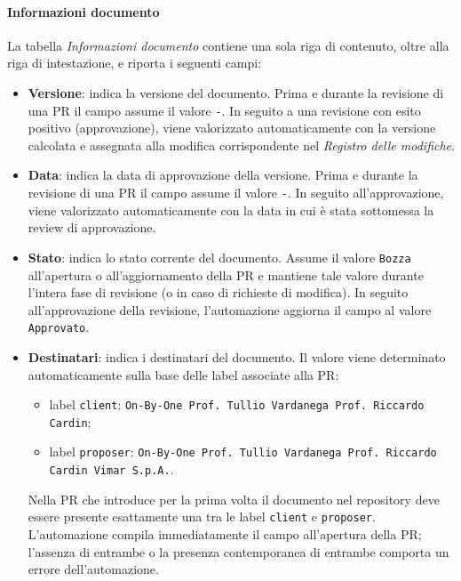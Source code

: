 \documentclass[11pt, a4paper]{article}
\begin{document}
\paragraph{Informazioni documento}

La tabella \textit{Informazioni documento} contiene una sola riga di contenuto, oltre alla riga di intestazione, e riporta i seguenti campi:

\begin{itemize}
    \item \textbf{Versione}: indica la versione del documento. Prima e durante la revisione di una PR il campo assume il valore \texttt{-}. In seguito a una revisione con esito positivo (approvazione), viene valorizzato automaticamente con la versione calcolata e assegnata alla modifica corrispondente nel \textit{Registro delle modifiche}.

    \item \textbf{Data}: indica la data di approvazione della versione. Prima e durante la revisione di una PR il campo assume il valore \texttt{-}. In seguito all'approvazione, viene valorizzato automaticamente con la data in cui è stata sottomessa la review di approvazione.

    \item \textbf{Stato}: indica lo stato corrente del documento. Assume il valore \texttt{Bozza} all'apertura o all'aggiornamento della PR e mantiene tale valore durante l'intera fase di revisione (o in caso di richieste di modifica). In seguito all'approvazione della revisione, l'automazione aggiorna il campo al valore \texttt{Approvato}.

    \item \textbf{Destinatari}: indica i destinatari del documento. Il valore viene determinato automaticamente sulla base delle label associate alla PR:
    \begin{itemize}
        \item label \texttt{client}:
        \texttt{On-By-One \newline Prof. Tullio Vardanega \newline Prof. Riccardo Cardin};
        \item label \texttt{proposer}:
        \texttt{On-By-One \newline Prof. Tullio Vardanega \newline Prof. Riccardo Cardin \newline Vimar S.p.A.}.
    \end{itemize}
    Nella PR che introduce per la prima volta il documento nel repository deve essere presente esattamente una tra le label \texttt{client} e \texttt{proposer}. L'automazione compila immediatamente il campo all'apertura della PR; l'assenza di entrambe o la presenza contemporanea di entrambe comporta un errore dell'automazione.


\end{itemize}
\end{document}
